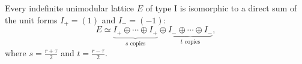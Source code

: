 Every indefinite unimodular lattice $E$ of type I is isomorphic to a direct sum of the unit forms $I_+ = (1)$ and $I_- = (-1)$:
$$
E \simeq \underbrace{I_+ \oplus \cdots \oplus I_+}_{s \text{ copies}} \oplus \underbrace{I_- \oplus \cdots \oplus I_-}_{t \text{ copies}},
$$
where $s = \frac{r+\tau}{2}$ and $t = \frac{r-\tau}{2}$.
